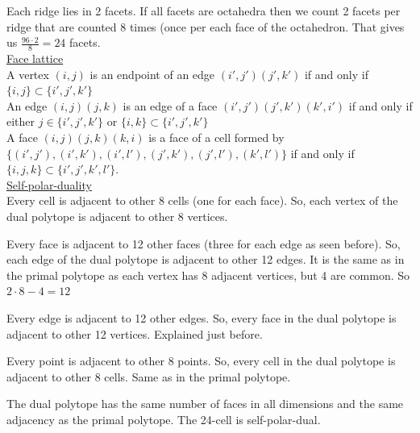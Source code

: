 \documentclass[paper=a4, fontsize=11pt]{scrartcl} %
\theoremstyle{plain}
\begin{document}
Each ridge lies in 2 facets. If all facets are octahedra then we count 2 facets per ridge that are counted 8 times (once per each face of the octahedron. That gives us $\frac{96 \cdot 2}{8} = 24$ facets. \\

\underline{Face lattice} \\

A vertex $(i,j)$ is an endpoint of an edge $(i',j')(j',k')$ if and only if $\{i,j\} \subset \{i',j',k'\}$ \\

An edge $(i,j)(j,k)$ is an edge of a face $(i',j')(j',k')(k',i')$ if and only if either $j \in \{i',j',k'\}$ or $\{i,k\} \subset \{i',j',k'\}$ \\

A face $(i,j)(j,k)(k,i)$ is a face of a cell formed by $\{(i',j'),(i',k'),(i',l'),(j',k'),(j',l'),(k',l')\}$ if and only if $\{i,j,k\} \subset \{i',j',k',l'\}$.\\

\underline{Self-polar-duality} \\

Every cell is adjacent to other 8 cells (one for each face). So, each vertex of the dual polytope is adjacent to other 8 vertices.

Every face is adjacent to 12 other faces (three for each edge as seen before). So, each edge of the dual polytope is adjacent to other 12 edges. It is the same as in the primal polytope as each vertex has 8 adjacent vertices, but 4 are common. So $2 \cdot 8-4=12$

Every edge is adjacent to 12 other edges. So, every face in the dual polytope is adjacent to other 12 vertices. Explained just before.

Every point is adjacent to other 8 points. So, every cell in the dual polytope is adjacent to other 8 cells. Same as in the primal polytope.

The dual polytope has the same number of faces in all dimensions and the same adjacency as the primal polytope. The 24-cell is self-polar-dual.
\end{document}
